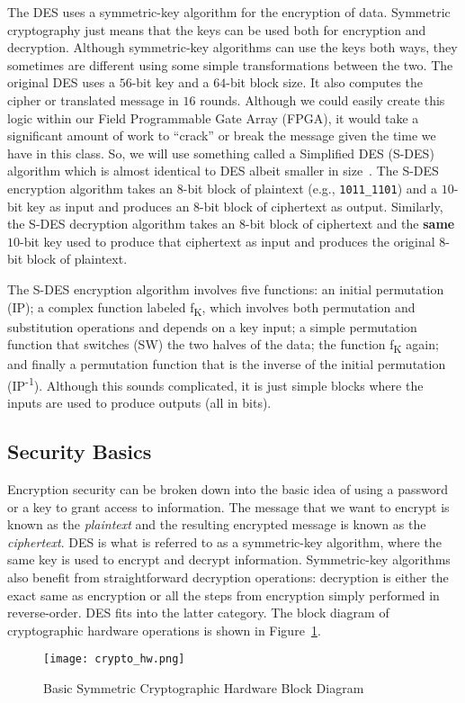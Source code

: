 \documentclass{article}
\begin{document}
The DES uses a symmetric-key algorithm for the encryption of data.
Symmetric cryptography just means that the keys can be used both for
encryption and decryption.  Although symmetric-key algorithms can use
the keys both ways, they sometimes are different using some simple
transformations between the two.
The original DES uses a $56$-bit key and a $64$-bit block size.  It
also computes the cipher or translated message in $16$
rounds. Although we could easily create this logic within our Field
Programmable Gate Array (FPGA), it would take a significant amount of
work to ``crack'' or break the message given the time we have in this
class. So, we will use something called a Simplified DES (S-DES)
algorithm which is almost identical to DES albeit smaller in
size~\cite{SchaeferEdwardF1996ASDE}.
The S-DES encryption algorithm takes an $8$-bit block of plaintext
(e.g., \verb!1011_1101!) and a $10$-bit key as input and
produces an $8$-bit block of ciphertext as output.
Similarly, the S-DES decryption algorithm takes an
$8$-bit block of ciphertext and the \textbf{same}
$10$-bit key used to produce that
ciphertext as input and produces the original $8$-bit block of
plaintext.

The S-DES encryption algorithm involves five functions: an initial
permutation (IP); a complex function labeled f\textsubscript{K}, which involves both
permutation and substitution operations and depends on
a key input; a simple permutation function that switches (SW) the two
halves of the data; the function f\textsubscript{K} again; and finally
a permutation
function that is the inverse of the initial permutation
(IP\textsuperscript{-1}).
Although this sounds complicated, it is just simple blocks where the
inputs are used to produce outputs (all in bits).  

\subsection{Security Basics}

Encryption security can be broken down into the basic idea of using a password
or a key to grant access to information.  The message that we want to encrypt is
known as the \textit{plaintext} and the resulting encrypted message is known as the
\textit{ciphertext}.  DES is what is referred to as a symmetric-key algorithm, where the
same key is used to encrypt and decrypt information.  Symmetric-key algorithms
also benefit from straightforward decryption operations: decryption is either
the exact same as encryption or all the steps from encryption simply performed
in reverse-order.  DES fits into the latter category.  The block diagram of
cryptographic hardware operations is shown in Figure~\ref{crypto_hw.png}.
\begin{figure}
  \centering
  \texttt{[image: crypto\_hw.png]}
  \caption{Basic Symmetric Cryptographic Hardware Block Diagram}
  \label{crypto_hw.png}
\end{figure}
\end{document}

